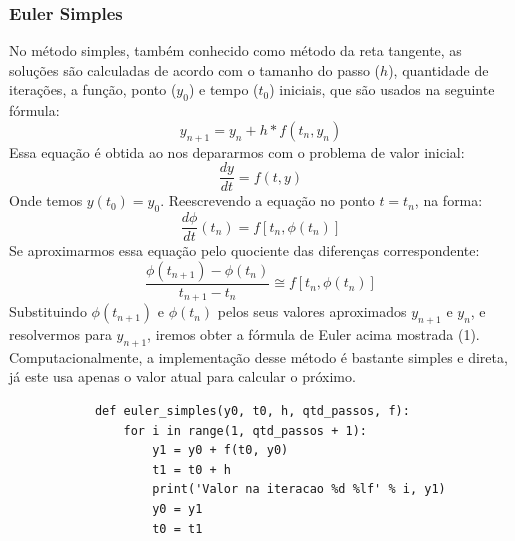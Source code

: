 \documentclass{article}
\begin{document}
\begin{otherlanguage}{brazil}
        \subsubsection{Euler Simples}
            No método simples, também conhecido como método da reta tangente, as soluções são calculadas de acordo com o tamanho do passo ($h$), quantidade de iterações, a função, ponto ($y_0$) e tempo ($t_0$) iniciais, que são usados na seguinte fórmula:
            \begin{equation}
                y_{n+1} = y_n + h * f(t_n, y_n)
            \end{equation}
            Essa equação é obtida ao nos depararmos com o problema de valor inicial:
            \begin{equation}
                \frac{dy}{dt} = f(t, y)
            \end{equation}
            Onde temos $y(t_0) = y_0$.
            Reescrevendo a equação no ponto $t = t_n$, na forma:
            \begin{equation}
                \frac{d\phi}{dt}(t_n) = f[t_n, \phi(t_n)]
            \end{equation}
            Se aproximarmos essa equação pelo quociente das diferenças correspondente:
            \begin{equation}
                \frac{\phi(t_{n+1}) - \phi(t_n)}{t_{n+1} - t_n} \cong f[t_n, \phi(t_n)]
            \end{equation}
            Substituindo $\phi(t_{n+1})$ e $\phi(t_n)$ pelos seus valores aproximados $y_{n+1}$ e $y_n$, e resolvermos para $y_{n+1}$, iremos obter a fórmula de Euler acima mostrada (1).\newline
            Computacionalmente, a implementação desse método é bastante simples e direta, já este usa apenas o valor atual para calcular o próximo.\newline\newline\newline
 
            \begin{lstlisting}
            def euler_simples(y0, t0, h, qtd_passos, f):
                for i in range(1, qtd_passos + 1):
                    y1 = y0 + f(t0, y0)
                    t1 = t0 + h
                    print('Valor na iteracao %d %lf' % i, y1)
                    y0 = y1
                    t0 = t1
            \end{lstlisting}

\end{otherlanguage}
\end{document}
